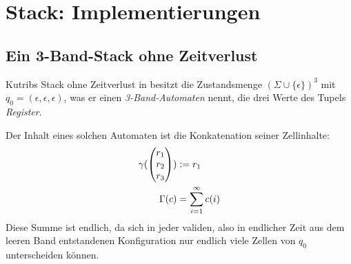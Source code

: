 \documentclass{article}
\begin{document}
\section{Stack: Implementierungen}

\subsection{Ein 3-Band-Stack ohne Zeitverlust}

Kutribs Stack ohne Zeitverlust in \cite{kutrib08} besitzt die Zustandsmenge $(\Sigma \cup \{\epsilon\})^3$ mit $q_0 = (\epsilon,\epsilon,\epsilon)$, was er einen \emph{3-Band-Automaten} nennt, die drei Werte des Tupels \emph{Register}.

Der Inhalt eines solchen Automaten ist die Konkatenation seiner Zellinhalte:
\begin{align*}
    \gamma(\begin{pmatrix}r_1\\r_2\\r_3\end{pmatrix}) &:= r_1 \\
    \Gamma(c) &= \sum^\infty_{i=1} c(i)
\end{align*}
Diese Summe ist endlich, da sich in jeder validen, also in endlicher Zeit aus dem leeren Band entstandenen Konfiguration nur endlich viele Zellen von $q_0$ unterscheiden können.
\end{document}
